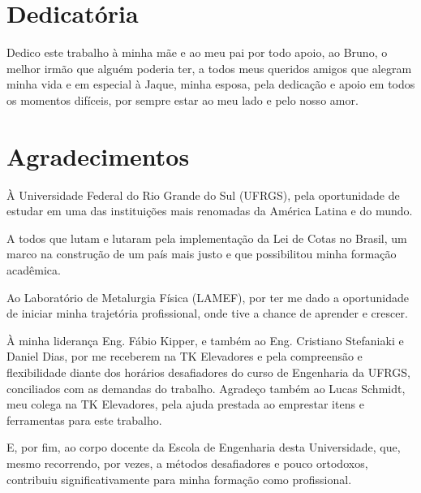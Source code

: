 \documentclass[repeatfields,xlists,xpacks,oneside]{ufrgscca}
\begin{document}

\notoc\chapter{Dedicatória}
Dedico este trabalho à minha mãe e ao meu pai por todo apoio, ao Bruno, o melhor irmão que alguém poderia ter, a todos meus queridos amigos que alegram minha vida e em especial à Jaque, minha esposa, pela dedicação e apoio em todos os momentos difíceis, por sempre estar ao meu lado e pelo nosso amor.

\notoc\chapter{Agradecimentos}

À Universidade Federal do Rio Grande do Sul (UFRGS), pela oportunidade de estudar em uma das instituições mais renomadas da América Latina e do mundo.

A todos que lutam e lutaram pela implementação da Lei de Cotas no Brasil, um marco na construção de um país mais justo e que possibilitou minha formação acadêmica.

Ao Laboratório de Metalurgia Física (LAMEF), por ter me dado a oportunidade de iniciar minha trajetória profissional, onde tive a chance de aprender e crescer.

À minha liderança Eng. Fábio Kipper, e também ao Eng. Cristiano Stefaniaki e Daniel Dias, por me receberem na TK Elevadores e pela compreensão e flexibilidade diante dos horários desafiadores do curso de Engenharia da UFRGS, conciliados com as demandas do trabalho. Agradeço também ao Lucas Schmidt, meu colega na TK Elevadores, pela ajuda prestada ao emprestar itens e ferramentas para este trabalho.

E, por fim, ao corpo docente da Escola de Engenharia desta Universidade, que, mesmo recorrendo, por vezes, a métodos desafiadores e pouco ortodoxos, contribuiu significativamente para minha formação como profissional.


\end{document}
